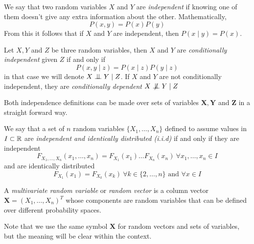 \begin{definition}
We say that two random variables \(X\) and \(Y\) are \emph{independent} if knowing one of them doesn't give any extra information about the other. Mathematically,
\[
P(x,y) = P(x)P(y)
\]
From this it follows that if \(X\) and \(Y\) are independent, then \(P(x\mid y) = P(x)\).
\end{definition}


\begin{definition}
Let \(X,Y\) and \(Z\) be three random variables, then \(X\) and \(Y\) are
\emph{conditionally independent} given \(Z\) if and only if
\[
P(x,y \mid  z) = P(x\mid z)P(y\mid z)
\]
in that case we will denote \(X \bigCI Y \mid Z\). If \(X\) and \(Y\) are not
conditionally independent, they are \emph{conditionally dependent} \(X \bigCD Y \mid Z\)

\end{definition}

Both independence definitions can be made over sets of variables \(\bm{X},
\bm{Y}\) and \(\bm{Z}\) in a straight forward way.


\begin{definition}
  We say that a set of \(n\) random variables \(\{X_1,\dots,X_n\}\) defined to
  assume values in \(I \subset \mathbb{R}\) are
  \emph{independent and identically distributed (i.i.d)}
  if and only if they are independent
  \[
    F_{X_1,\dots,X_n}(x_1,\dots,x_n) = F_{X_1}(x_1)\dots F_{X_n}(x_n) \ \forall
    x_1,\dots,x_n \in I
  \]
  and are identically distributed
  \[
    F_{X_1}(x_1) = F_{X_k}(x_k) \ \forall k \in \{2,\dots,n\} \text{ and } \forall x
    \in I
  \]


\end{definition}


\begin{definition}
  A \emph{multivariate random variable} or \emph{random vector} is a column vector \(\bm{X} =
  (X_1,\dots,X_n)^T\) whose components are random variables that can be defined
  over different probability spaces.

  Note that we use the same symbol \(\bm{X}\) for random vectors and sets of
  variables, but the meaning will be clear within the context.
\end{definition}
